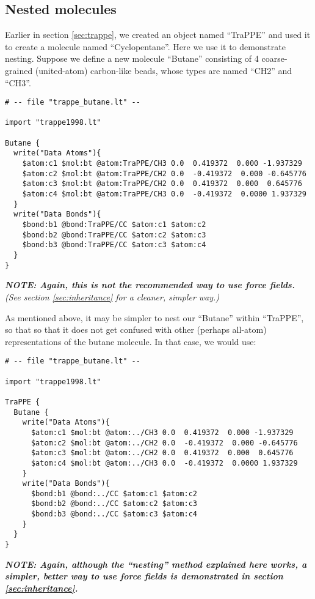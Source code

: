 \documentclass[11pt]{article}
\begin{document}
\subsection{Nested molecules}
\label{sec:butane}
Earlier in section \ref{sec:trappe}, we created an object named ``TraPPE''
and used it to create a molecule named ``Cyclopentane''.
Here we use it to demonstrate nesting.
Suppose we define a new molecule ``Butane'' consisting of 4 coarse-grained
(united-atom) carbon-like beads, whose types are named ``CH2'' and ``CH3''.
\begin{verbatim}
# -- file "trappe_butane.lt" --

import "trappe1998.lt"

Butane {
  write("Data Atoms"){
    $atom:c1 $mol:bt @atom:TraPPE/CH3 0.0  0.419372  0.000 -1.937329
    $atom:c2 $mol:bt @atom:TraPPE/CH2 0.0  -0.419372  0.000 -0.645776
    $atom:c3 $mol:bt @atom:TraPPE/CH2 0.0  0.419372  0.000  0.645776
    $atom:c4 $mol:bt @atom:TraPPE/CH3 0.0  -0.419372  0.0000 1.937329
  }
  write("Data Bonds"){
    $bond:b1 @bond:TraPPE/CC $atom:c1 $atom:c2
    $bond:b2 @bond:TraPPE/CC $atom:c2 $atom:c3
    $bond:b3 @bond:TraPPE/CC $atom:c3 $atom:c4
  }
}
\end{verbatim}


\textit{\textbf{NOTE: Again, this is not the recommended way to use
force fields.} (See section \ref{sec:inheritance} for a cleaner, simpler way.)}

As mentioned above, it may be simpler to nest our ``Butane''
within ``TraPPE'', so that so that it does not get confused with other
(perhaps all-atom) representations of the butane molecule.
In that case, we would use:
\begin{verbatim}
# -- file "trappe_butane.lt" --

import "trappe1998.lt"

TraPPE {
  Butane {
    write("Data Atoms"){
      $atom:c1 $mol:bt @atom:../CH3 0.0  0.419372  0.000 -1.937329
      $atom:c2 $mol:bt @atom:../CH2 0.0  -0.419372  0.000 -0.645776
      $atom:c3 $mol:bt @atom:../CH2 0.0  0.419372  0.000  0.645776
      $atom:c4 $mol:bt @atom:../CH3 0.0  -0.419372  0.0000 1.937329
    }
    write("Data Bonds"){
      $bond:b1 @bond:../CC $atom:c1 $atom:c2
      $bond:b2 @bond:../CC $atom:c2 $atom:c3
      $bond:b3 @bond:../CC $atom:c3 $atom:c4
    }
  }
}
\end{verbatim}
\textit{\textbf{NOTE: Again, although the ``nesting'' method explained here
works, a simpler, better way to use force fields is demonstrated in section
\ref{sec:inheritance}.}}
\end{document}
